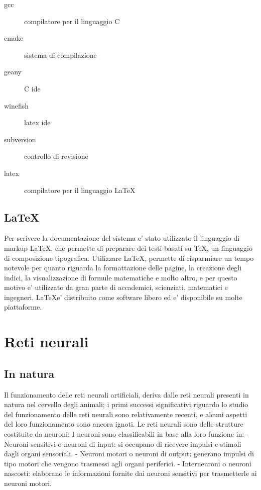 \documentclass[a4paper,10pt]{book}
\begin{document}
\begin{description}
\item[gcc] compilatore per il linguaggio C
\item[cmake] sistema di compilazione
\item[geany] C ide
\item[winefish] latex ide 
\item[subversion] controllo di revisione
\item[latex] compilatore per il linguaggio \LaTeX
\end{description}



\section{\LaTeX}
Per scrivere la documentazione del sistema e' stato utilizzato il linguaggio di markup
\LaTeX, che permette di preparare dei testi basati su \TeX, un linguaggio di composizione 
tipografica. Utilizzare \LaTeX, permette di risparmiare un tempo notevole per quanto riguarda
la formattazione delle pagine, la creazione degli indici, la visualizzazione di formule matematiche
e molto altro, e per questo motivo e' utilizzato da gran parte di accademici, scienziati, matematici
e ingegneri. \LaTeX e' distribuito come software libero ed e' disponibile su molte piattaforme.





\chapter{Reti neurali}
\section{In natura}
Il funzionamento delle reti neurali artificiali, deriva dalle reti neurali presenti
in natura nel cervello degli animali; i primi successi significativi riguardo lo studio 
del funzionamento delle reti neurali sono relativamente recenti, e alcuni aspetti
del loro funzionamento sono ancora ignoti.
Le reti neurali sono delle strutture costituite da neuroni; 
I neuroni sono classificabili in base alla loro funzione in:
 - Neuroni sensitivi o neuroni di input: si occupano di ricevere impulsi e stimoli 
	dagli organi sensoriali.
 - Neuroni motori o neuroni di output: generano impulsi di tipo motori che vengono
	trasmessi agli organi periferici.
 - Interneuroni o neuroni nascosti: elaborano le informazioni fornite dai neuroni 
	sensitivi per trasmetterle ai neuroni motori.
 
\end{document}
